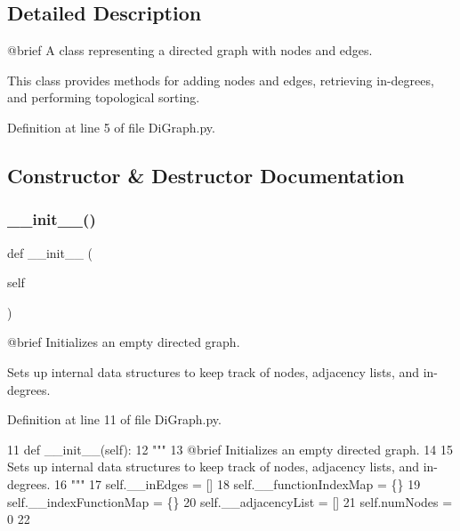 \subsection{Detailed Description}
\begin{DoxyVerb}@brief A class representing a directed graph with nodes and edges.

This class provides methods for adding nodes and edges, retrieving in-degrees, and performing topological sorting.
\end{DoxyVerb}
 

Definition at line 5 of file Di\+Graph.\+py.



\subsection{Constructor \& Destructor Documentation}
\mbox{\label{classDiGraph_1_1DiGraph_ae64f0875afe3067b97ba370b354b9213}} 
\subsubsection{\texorpdfstring{\+\_\+\+\_\+init\+\_\+\+\_\+()}{\_\_init\_\_()}}
{\footnotesize\ttfamily def \+\_\+\+\_\+init\+\_\+\+\_\+ (\begin{DoxyParamCaption}\item[{}]{self }\end{DoxyParamCaption})}

\begin{DoxyVerb}@brief Initializes an empty directed graph.

Sets up internal data structures to keep track of nodes, adjacency lists, and in-degrees.
\end{DoxyVerb}
 

Definition at line 11 of file Di\+Graph.\+py.


\begin{DoxyCode}
11     \textcolor{keyword}{def }\_\_init\_\_(self):
12         \textcolor{stringliteral}{"""
}
13 \textcolor{stringliteral}{        @brief Initializes an empty directed graph.
}
14 \textcolor{stringliteral}{
}
15 \textcolor{stringliteral}{        Sets up internal data structures to keep track of nodes, adjacency lists, and in-degrees.
}
16 \textcolor{stringliteral}{        """}
17         self.\_\_inEdges = []
18         self.\_\_functionIndexMap = \{\}
19         self.\_\_indexFunctionMap = \{\}
20         self.\_\_adjacencyList = []
21         self.numNodes = 0
22     
\end{DoxyCode}


